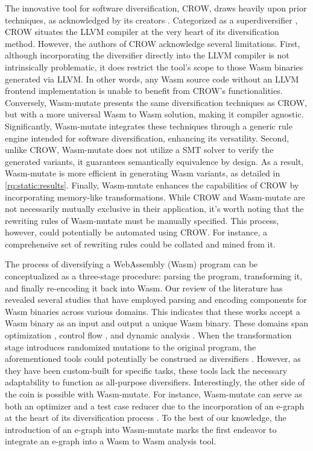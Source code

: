 \documentclass[sigplan,screen]{acmart}
\newcommand*\badge[1]{ \colorbox{red}{\color{white}#1}}
\newcommand{\tool}{Wasm-mutate\xspace}
\newcommand{\wasm}{Wasm\xspace}
\newcommand{\todo}[1]{%
\refstepcounter{todo}
\noindent\textbf{\badge{TODO}} {\color{red}#1}
\addcontentsline{td}{todo}
{\color{red}\thesection.\thetodo\xspace #1}}
\begin{document}
The innovative tool for software diversification, CROW, draws heavily upon prior techniques, as acknowledged by its creators \cite{arteaga2020crow}. Categorized as a superdiversifier \cite{jacob2008superdiversifier}, CROW situates the LLVM compiler at the very heart of its diversification method.
However, the authors of CROW acknowledge several limitations. 
First, although incorporating the diversifier directly into the LLVM compiler is not intrinsically problematic, it does restrict the tool's scope to those \wasm binaries generated via LLVM. 
In other words, any \wasm source code without an LLVM frontend implementation is unable to benefit from CROW's functionalities.
Conversely, \tool presents the same diversification techniques as CROW, but with a more universal \wasm to \wasm solution, making it compiler agnostic. Significantly, \tool integrates these techniques through a generic rule engine intended for software diversification, enhancing its versatility.
Second, unlike CROW, \tool does not utilize a SMT solver to verify the generated variants, it guarantees semantically equivalence by design. 
As a result, \tool is more efficient in generating \wasm variants, as detailed in \autoref{rq:static:results}.
Finally, \tool enhances the capabilities of CROW by incorporating memory-like transformations. 
While CROW and \tool are not necessarily mutually exclusive in their application, it's worth noting that the rewriting rules of \tool must be manually specified. 
This process, however, could potentially be automated using CROW. 
For instance, a comprehensive set of rewriting rules could be collated and mined from it.

The process of diversifying a WebAssembly (\wasm) program can be conceptualized as a three-stage procedure: parsing the program, transforming it, and finally re-encoding it back into \wasm. 
Our review of the literature has revealed several studies that have employed parsing and encoding components for \wasm binaries across various domains. 
This indicates that these works accept a \wasm binary as an input and output a unique \wasm binary. 
These domains span optimization \cite{wasmslim}, control flow \cite{10123627}, and dynamic analysis \cite{wasabi, stievenart2020compositional, 10123627, BRITO2022102745}.
When the transformation stage introduces randomized mutations to the original program, the aforementioned tools could potentially be construed as diversifiers \cite{some paper claming this}.
However, as they have been custom-built for specific tasks, these tools lack the necessary adaptability to function as all-purpose diversifiers. 
Interestingly, the other side of the coin is possible with \tool.
For instance, \tool can serve as both an optimizer and a test case reducer due to the incorporation of an e-graph at the heart of its diversification process \cite{10.1145/1480881.1480915}. 
To the best of our knowledge, the introduction of an e-graph into \tool marks the first endeavor to integrate an e-graph into a \wasm to \wasm analysis tool.
\end{document}
